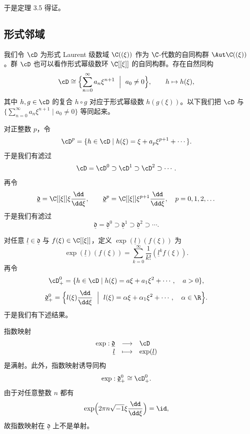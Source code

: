 于是定理 3.5 得证。


\subsection{形式邻域}

我们令 $\cD$ 为形式 Laurent 级数域 $\C((\xi))$ 作为 $\C$-代数的自同构群 $\Aut\C((\xi))$。群 $\cD$ 也可以看作形式幂级数环 $\C[[\xi]]$ 的自同构群。存在自然同构
\[
\cD\cong\Bigl\{\sum_{n=0}^{\infty}a_n\xi^{n+1}\ \Bigm|\ a_0\ne0\Bigr\},\qquad h\mapsto h(\xi),
\]
其中 $h,g\in\cD$ 的复合 $h\circ g$ 对应于形式幂级数 $h(g(\xi))$。以下我们把 $\cD$ 与 $\{\sum_{n=0}^{\infty}a_n\xi^{n+1}\mid a_0\ne0\}$ 等同起来。

对正整数 $p$，令
\[
\cD^{p}=\{h\in\cD\mid h(\xi)=\xi+a_p\xi^{p+1}+\cdots\}.
\]
于是我们有滤过
\[
\cD=\cD^{0}\supset\cD^{1}\supset\cD^{2}\supset\cdots.
\]
再令
\[
\underline{\mathfrak{d}}=\C[[\xi]]\xi\frac{\dd}{\dd\xi},\qquad
\underline{\mathfrak{d}}^{p}=\C[[\xi]]\xi^{p+1}\frac{\dd}{\dd\xi},\quad p=0,1,2,\dots
\]
于是我们有滤过
\[
\underline{\mathfrak{d}}=\underline{\mathfrak{d}}^{0}\supset\underline{\mathfrak{d}}^{1}\supset\underline{\mathfrak{d}}^{2}\supset\cdots.
\]


对任意 $\underline l\in\underline{\mathfrak d}$ 与 $f(\xi)\in\C[[\xi]]$，定义 $\exp(\underline l)(f(\xi))$ 为
\[
\exp(\underline l)(f(\xi))=\sum_{k=0}^{\infty}\frac{1}{k!}(\underline l^k f(\xi)).
\]
再令
\[
\cD_+^{0}=\{h\in\cD\mid h(\xi)=a\xi+a_1\xi^{2}+\cdots,\quad a>0\},
\]
\[
\underline{\mathfrak d}_+^{0}=\Bigl\{l(\xi)\frac{\dd}{\dd\xi}\ \Bigm|\ l(\xi)=\alpha\xi+\alpha_1\xi^{2}+\cdots,\quad\alpha\in\R\Bigr\}.
\]
于是我们有下述结果。

\begin{lemma}[3.11]
指数映射
\[
\begin{array}{rcl}
\exp:\underline{\mathfrak d}&\longrightarrow&\cD\\
\underline l&\longmapsto&\exp(\underline l)
\end{array}
\]
是满射。此外，指数映射诱导同构
\[
\exp:\underline{\mathfrak d}_+^{0}\cong\cD_+^{0}.
\]
由于对任意整数 $n$ 都有
\[
\exp\Bigl(2\pi n\sqrt{-1}\xi\frac{\dd}{\dd\xi}\Bigr)=\id,
\]
故指数映射在 $\underline{\mathfrak d}$ 上不是单射。
\end{lemma}

